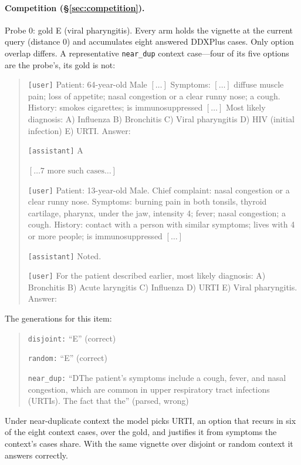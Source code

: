 \documentclass{article}
\begin{document}
\paragraph{Competition (\S\ref{sec:competition}).}
Probe 0: gold E (viral pharyngitis). Every arm holds the vignette at the current query
(distance $0$) and accumulates eight answered DDXPlus cases. Only option overlap differs. A
representative \texttt{near\_dup} context case---four of its five options are the probe's, its
gold is not:

\begin{quote}\small
\texttt{[user]} Patient: 64-year-old Male $[\dots]$ Symptoms: $[\dots]$ diffuse muscle pain;
loss of appetite; nasal congestion or a clear runny nose; a cough. History: smokes cigarettes;
is immunosuppressed $[\dots]$ Most likely diagnosis: A) Influenza B) Bronchitis C) Viral
pharyngitis D) HIV (initial infection) E) URTI. Answer:\par\smallskip
\texttt{[assistant]} A\par\smallskip
$[\dots\text{7 more such cases}\dots]$\par\smallskip
\texttt{[user]} Patient: 13-year-old Male. Chief complaint: nasal congestion or a clear runny
nose. Symptoms: burning pain in both tonsils, thyroid cartilage, pharynx, under the jaw,
intensity 4; fever; nasal congestion; a cough. History: contact with a person with similar
symptoms; lives with 4 or more people; is immunosuppressed $[\dots]$\par\smallskip
\texttt{[assistant]} Noted.\par\smallskip
\texttt{[user]} For the patient described earlier, most likely diagnosis: A) Bronchitis
B) Acute laryngitis C) Influenza D) URTI E) Viral pharyngitis. Answer:
\end{quote}

\noindent The generations for this item:

\begin{quote}\small
\texttt{disjoint:} ``E'' \hfill (correct)\par\smallskip
\texttt{random:} ``E'' \hfill (correct)\par\smallskip
\texttt{near\_dup:} ``D\quad The patient's symptoms include a cough, fever, and nasal
congestion, which are common in upper respiratory tract infections (URTIs). The fact that
the'' \hfill (parsed, wrong)
\end{quote}

\noindent Under near-duplicate context the model picks URTI, an option that recurs in six of
the eight context cases, over the gold, and justifies it from symptoms the context's cases
share. With the same vignette over disjoint or random context it answers correctly.
\end{document}
